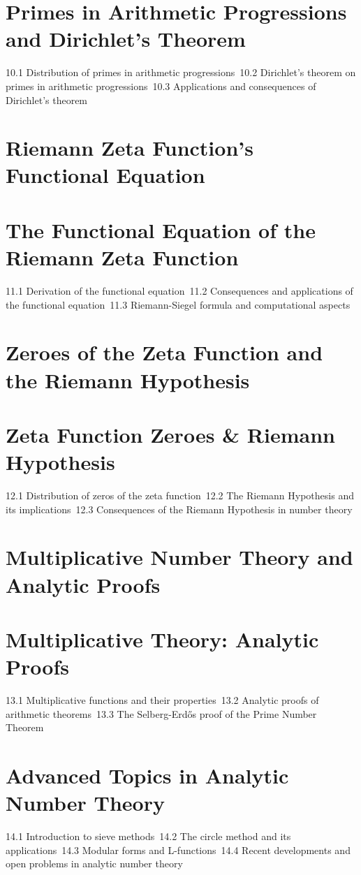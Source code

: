 \section{Primes in Arithmetic Progressions and Dirichlet's Theorem}
10.1 Distribution of primes in arithmetic progressions\
10.2 Dirichlet's theorem on primes in arithmetic progressions\
10.3 Applications and consequences of Dirichlet's theorem\
\section{Riemann Zeta Function's Functional Equation}
\section{The Functional Equation of the Riemann Zeta Function}
11.1 Derivation of the functional equation\
11.2 Consequences and applications of the functional equation\
11.3 Riemann-Siegel formula and computational aspects\
\section{Zeroes of the Zeta Function and the Riemann Hypothesis}
\section{Zeta Function Zeroes \& Riemann Hypothesis}
12.1 Distribution of zeros of the zeta function\
12.2 The Riemann Hypothesis and its implications\
12.3 Consequences of the Riemann Hypothesis in number theory\
\section{Multiplicative Number Theory and Analytic Proofs}
\section{Multiplicative Theory: Analytic Proofs}
13.1 Multiplicative functions and their properties\
13.2 Analytic proofs of arithmetic theorems\
13.3 The Selberg-Erdős proof of the Prime Number Theorem\
\section{Advanced Topics in Analytic Number Theory}
14.1 Introduction to sieve methods\
14.2 The circle method and its applications\
14.3 Modular forms and L-functions\
14.4 Recent developments and open problems in analytic number theory\
